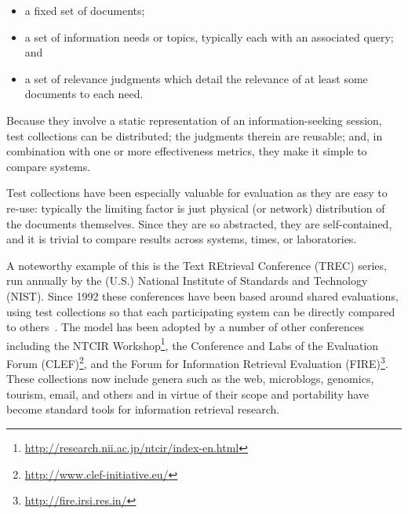 \begin{itemize}
	\item a fixed set of documents; 
	\item a set of information needs or topics, typically each with an associated query; and 
	\item a set of relevance judgments which detail the relevance of at least some documents to each need.
\end{itemize}

Because they involve a static representation of an information-seeking session, test collections can be distributed; the judgments therein are reusable; and, in combination with one or more effectiveness metrics, they make it simple to compare systems.
%


Test collections have been especially valuable for evaluation as they are easy to re-use: typically the limiting factor is just physical (or network) distribution of the documents themselves. Since they are so abstracted, they are self-contained, and it is trivial to compare results across systems, times, or laboratories.

A noteworthy example of this is the Text REtrieval Conference (TREC) series, run annually by the (U.S.) National Institute of Standards and Technology (NIST). Since 1992 these conferences have been based around shared evaluations, using test collections so that each participating system can be directly compared to others~\cite{voor:trec05}. The model has been adopted by a number of other conferences including the NTCIR Workshop\footnote{\url{http://research.nii.ac.jp/ntcir/index-en.html}}, the Conference and Labs of the Evaluation Forum (CLEF)\footnote{\url{http://www.clef-initiative.eu/}}, and the Forum for Information Retrieval Evaluation (FIRE)\footnote{\url{http://fire.irsi.res.in/}}. These collections now include genera such as the web, microblogs, genomics, tourism, email, and others and in virtue of their scope and portability have become standard tools for information retrieval research.

